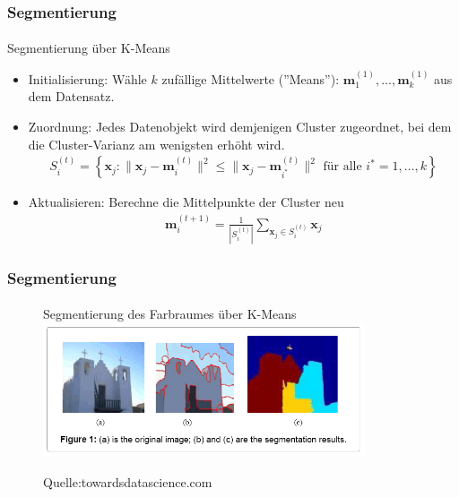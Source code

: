 \documentclass{beamer}
\begin{document}
\begin{frame}
    \frametitle{Segmentierung}
\framesubtitle{}
\begin{block}{Segmentierung über K-Means}
\begin{itemize}
 \item Initialisierung: Wähle $k$ zufällige Mittelwerte (''Means''): $ \mathbf m_1^{(1)}, \ldots, \mathbf m_k^{(1)} $ aus dem Datensatz.
 \item  Zuordnung: Jedes Datenobjekt wird demjenigen Cluster zugeordnet, bei dem die Cluster-Varianz am wenigsten erhöht wird. 
\begin{align*}
S_i^{(t)} = \left\{ \mathbf x_j : \big\| \mathbf x_j - \mathbf m^{(t)}_i \big\|^2 \leq \big\| \mathbf x_j - \mathbf m^{(t)}_{i^*} \big\|^2 \text{ für alle }i^*=1,\ldots,k \right\} 
\end{align*}
\item Aktualisieren: Berechne die Mittelpunkte der Cluster neu 
\begin{align*}
\mathbf m_i^{(t+1)} = \frac{1}{|S_i^{(t)}|} \sum_{\mathbf x_j \in S_{i}^{(t)}} \mathbf x_j  
\end{align*}
\end{itemize}
\end{block}


 \end{frame}





\begin{frame}
    \frametitle{Segmentierung}
\framesubtitle{}
\begin{figure}[htp]
      \centering
Segmentierung des Farbraumes über K-Means \\
    \includegraphics[width=0.85\textwidth]{img/segmentation_kmeans} 
      \caption{Quelle:towardsdatascience.com}
\end{figure}


 \end{frame}
\end{document}
